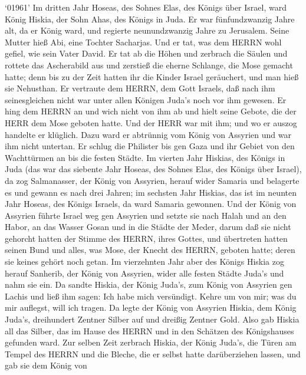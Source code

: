  `01961' Im dritten Jahr Hoseas, des Sohnes Elas, des Königs
über Israel, ward König Hiskia, der Sohn Ahas, des Königs in Juda.
 Er war fünfundzwanzig Jahre alt, da er König ward, und
regierte neunundzwanzig Jahre zu Jerusalem. Seine Mutter hieß Abi, eine
Tochter Sacharjas.  Und er tat, was dem HERRN wohl gefiel,
wie sein Vater David.  Er tat ab die Höhen und zerbrach die
Säulen und rottete das Ascherabild aus und zerstieß die eherne Schlange,
die Mose gemacht hatte; denn bis zu der Zeit hatten ihr die Kinder
Israel geräuchert, und man hieß sie Nehusthan.  Er vertraute
dem HERRN, dem Gott Israels, daß nach ihm seinesgleichen nicht war unter
allen Königen Juda's noch vor ihm gewesen.  Er hing dem
HERRN an und wich nicht von ihm ab und hielt seine Gebote, die der HERR
dem Mose geboten hatte.  Und der HERR war mit ihm; und wo er
auszog handelte er klüglich. Dazu ward er abtrünnig vom König von
Assyrien und war ihm nicht untertan.  Er schlug die
Philister bis gen Gaza und ihr Gebiet von den Wachttürmen an bis die
festen Städte.  Im vierten Jahr Hiskias, des Königs in Juda
(das war das siebente Jahr Hoseas, des Sohnes Elas, des Königs über
Israel), da zog Salmanasser, der König von Assyrien, herauf wider
Samaria und belagerte es  und gewann es nach drei Jahren;
im sechsten Jahr Hiskias, das ist im neunten Jahr Hoseas, des Königs
Israels, da ward Samaria gewonnen.  Und der König von
Assyrien führte Israel weg gen Assyrien und setzte sie nach Halah und an
den Habor, an das Wasser Gosan und in die Städte der Meder,
 darum daß sie nicht gehorcht hatten der Stimme des HERRN,
ihres Gottes, und übertreten hatten seinen Bund und alles, was Mose, der
Knecht des HERRN, geboten hatte; deren sie keines gehört noch getan.
 Im vierzehnten Jahr aber des Königs Hiskia zog herauf
Sanherib, der König von Assyrien, wider alle festen Städte Juda's und
nahm sie ein.  Da sandte Hiskia, der König Juda's, zum
König von Assyrien gen Lachis und ließ ihm sagen: Ich habe mich
versündigt. Kehre um von mir; was du mir auflegst, will ich tragen. Da
legte der König von Assyrien Hiskia, dem König Juda's, dreihundert
Zentner Silber auf und dreißig Zentner Gold.  Also gab
Hiskia all das Silber, das im Hause des HERRN und in den Schätzen des
Königshauses gefunden ward.  Zur selben Zeit zerbrach
Hiskia, der König Juda's, die Türen am Tempel des HERRN und die Bleche,
die er selbst hatte darüberziehen lassen, und gab sie dem König von
